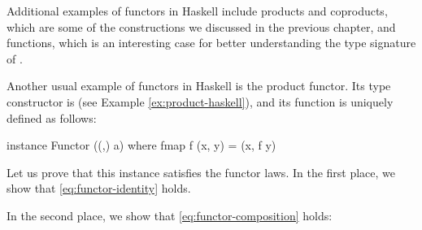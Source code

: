 Additional examples of functors in Haskell include products and
coproducts, which are some of the constructions we discussed in the
previous chapter, and functions, which is an interesting case for
better understanding the type signature of .

\begin{example}
  \label{ex:functor-product-haskell}


  Another usual example of functors in Haskell is the product functor.
  Its type constructor is  (see Example
  \ref{ex:product-haskell}), and its  function is
  uniquely defined as follows:
  \begin{codehaskell}
instance Functor ((,) a) where
  fmap f (x, y) = (x, f y)
  \end{codehaskell}
  Let us prove that this instance satisfies the functor laws. In the
  first place, we show that \eqref{eq:functor-identity} holds.
  \begin{steps}
  \end{steps}
  In the second place, we show that \eqref{eq:functor-composition}
  holds:
  \begin{steps}
  \end{steps}

\end{example}

